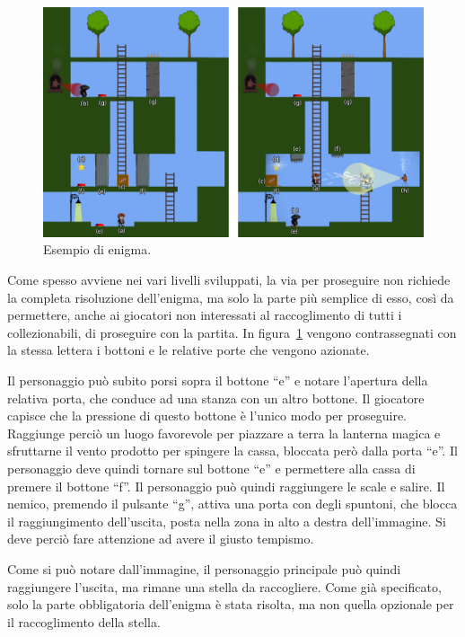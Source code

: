 \begin{figure}%
	\centering
	\includegraphics[width= \columnwidth]{images/gameDesign/13.jpg}
	\caption{Esempio di enigma.}
	\label{fig:platform_enigma}
\end{figure}

Come spesso avviene nei vari livelli sviluppati, la via per proseguire non richiede la completa risoluzione dell’enigma, ma solo la parte più semplice di esso, così da permettere, anche ai giocatori non interessati al raccoglimento di tutti i collezionabili, di proseguire con la partita.
In figura~\ref{fig:platform_enigma} vengono contrassegnati con la stessa lettera i bottoni e le relative porte che vengono azionate.

Il personaggio può subito porsi sopra il bottone “e” e notare l’apertura della relativa porta, che conduce ad una stanza con un altro bottone. Il giocatore capisce che la pressione di questo bottone è l’unico modo per proseguire. Raggiunge perciò un luogo favorevole per piazzare a terra la lanterna magica e sfruttarne il vento prodotto per spingere la cassa, bloccata però dalla porta “e”. Il personaggio deve quindi tornare sul bottone “e” e permettere alla cassa di premere il bottone “f”. Il personaggio può quindi raggiungere le scale e salire. Il nemico, premendo il pulsante “g”, attiva una porta con degli spuntoni, che blocca il raggiungimento dell’uscita, posta nella zona in alto a destra dell’immagine. Si deve perciò fare attenzione ad avere il giusto tempismo.

Come si può notare dall’immagine, il personaggio principale può quindi raggiungere l’uscita, ma rimane una stella da raccogliere. Come già specificato, solo la parte obbligatoria dell’enigma è stata risolta, ma non quella opzionale per il raccoglimento della stella.

